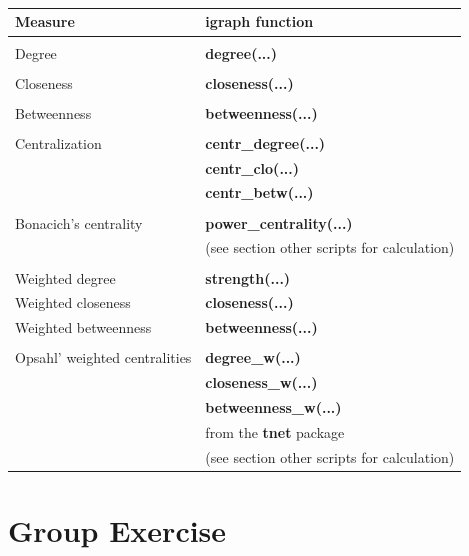 \documentclass[8pt]{beamer}
\begin{document}
\begin{frame}
\frametitle{\insertsection}

\small
\begin{table}
\begin{tabular}{ll}
\toprule
\textbf{Measure}        		& \textbf{igraph function} \\
\hline
\\
Degree                  		& \textbf{degree(...)}\\
\\
Closeness               		& \textbf{closeness(...)}\\
\\
Betweenness             		& \textbf{betweenness(...)}\\
\\
Centralization					& \textbf{centr\_degree(...)}\\
								& \textbf{centr\_clo(...)}\\ 
								&  \textbf{centr\_betw(...)}\\
\\
Bonacich's centrality			&  \textbf{power\_centrality(...)}\\
								& (see section other scripts for calculation)\\
\\
Weighted degree					& \textbf{strength(...)}\\
Weighted closeness				& \textbf{closeness(...)}\\
Weighted betweenness 			& \textbf{betweenness(...)}\\
\\
Opsahl' weighted centralities	& \textbf{degree\_w(...)}\\
								& \textbf{closeness\_w(...)}\\
								&\textbf{betweenness\_w(...)}\\
								&from the \textbf{tnet} package\\
								&(see section other scripts for calculation)\\
\bottomrule 
\end{tabular}
\end{table}
\end{frame}



\section*{Group Exercise}
\end{document}
